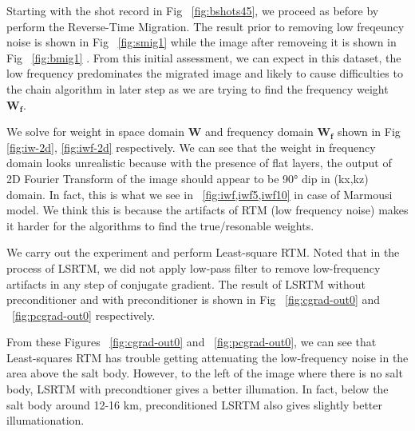 


Starting with the shot record in Fig ~\ref{fig:bshots45}, we proceed as before by perform the Reverse-Time Migration. The result prior to removing low freqeuncy noise is shown in Fig ~\ref{fig:smig1} while the image after removeing it is shown in Fig ~\ref{fig:bmig1} . From this initial assessment, we can expect in this dataset, the low frequency predominates the migrated image and likely to cause difficulties to the chain algorithm in later step as we are trying to find the frequency weight $\mathbf{W_f}$. 



We solve for weight in space domain $\mathbf{W}$ and frequency domain $\mathbf{W_f}$ shown in Fig \ref{fig:iw-2d}, \ref{fig:iwf-2d} respectively. We can see that the weight in frequency domain looks unrealistic because with the presence of flat layers, the output of 2D Fourier Transform of the image should appear to be 90° dip in (kx,kz) domain. In fact, this is what we see in ~\ref{fig:iwf,iwf5,iwf10} in case of Marmousi model. We think this is because the artifacts of RTM (low frequency noise) makes it harder for the algorithms to find the true/resonable weights.



We carry out the experiment and perform Least-square RTM. Noted that in the process of LSRTM, we did not apply low-pass filter to remove low-frequency artifacts in any step of conjugate gradient. The result of LSRTM without preconditioner and with preconditioner is shown in Fig ~\ref{fig:cgrad-out0} and ~\ref{fig:pcgrad-out0} respectively.


From these Figures ~\ref{fig:cgrad-out0} and ~\ref{fig:pcgrad-out0}, we can see that Least-squares RTM has trouble getting attenuating the low-frequency noise in the area above the salt body. However, to the left of the image where there is no salt body, LSRTM with precondtioner gives a better illumation. In fact, below the salt body around 12-16 km, preconditioned LSRTM also gives slightly better illumationation. 

